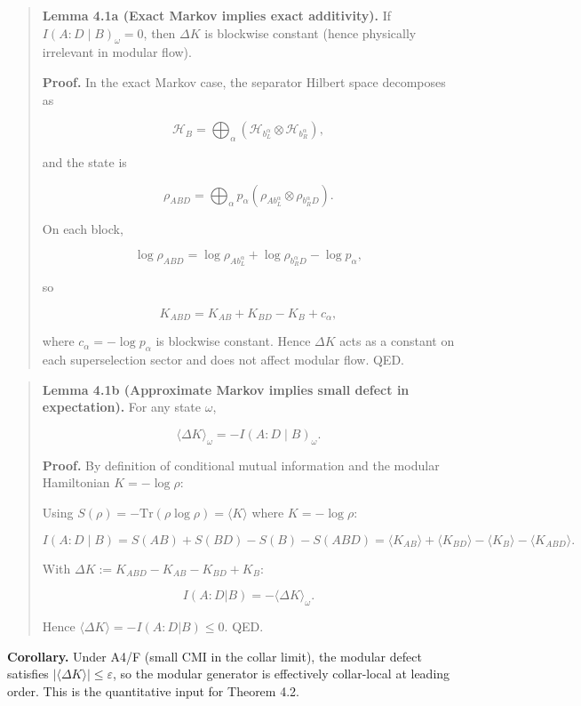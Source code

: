 \documentclass[
]{article}
\begin{document}
\begin{quote}
\textbf{Lemma 4.1a (Exact Markov implies exact additivity).} If
\(I(A:D \mid B)_\omega = 0\), then \(\Delta K\) is blockwise constant
(hence physically irrelevant in modular flow).

\textbf{Proof.} In the exact Markov case, the separator Hilbert space
decomposes as

\[
\mathcal H_B = \bigoplus_{\alpha} (\mathcal H_{b_L^{\alpha}} \otimes \mathcal H_{b_R^{\alpha}}),
\]

and the state is

\[
\rho_{ABD} = \bigoplus_{\alpha} p_{\alpha}
(\rho_{A b_L^{\alpha}} \otimes \rho_{b_R^{\alpha} D}).
\]

On each block,

\[
\log \rho_{ABD} = \log \rho_{A b_L^{\alpha}} + \log \rho_{b_R^{\alpha} D} - \log p_{\alpha},
\]

so

\[
K_{ABD} = K_{AB} + K_{BD} - K_B + c_\alpha,
\]

where \(c_\alpha = -\log p_\alpha\) is blockwise constant. Hence
\(\Delta K\) acts as a constant on each superselection sector and does
not affect modular flow. QED.
\end{quote}

\begin{quote}
\textbf{Lemma 4.1b (Approximate Markov implies small defect in
expectation).} For any state \(\omega\),

\[
\langle \Delta K \rangle_\omega = -I(A:D \mid B)_\omega.
\]

\textbf{Proof.} By definition of conditional mutual information and the
modular Hamiltonian \(K = -\log \rho\):

Using \(S(\rho) = -\mathrm{Tr}(\rho \log \rho) = \langle K \rangle\)
where \(K = -\log \rho\):

\[
I(A:D \mid B) = S(AB) + S(BD) - S(B) - S(ABD)
= \langle K_{AB} \rangle + \langle K_{BD} \rangle - \langle K_B \rangle - \langle K_{ABD} \rangle.
\]

With \(\Delta K := K_{ABD} - K_{AB} - K_{BD} + K_B\):

\[
I(A:D|B) = -\langle \Delta K \rangle_\omega.
\]

Hence \(\langle \Delta K \rangle = -I(A:D|B) \le 0\). QED.
\end{quote}

\textbf{Corollary.} Under A4/F (small CMI in the collar limit), the
modular defect satisfies \(|\langle \Delta K \rangle| \le \varepsilon\),
so the modular generator is effectively collar-local at leading order.
This is the quantitative input for Theorem 4.2.
\end{document}
